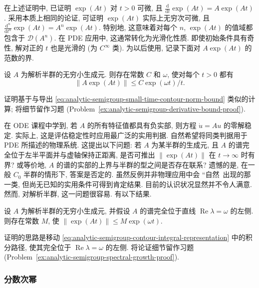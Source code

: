 在上述证明中, 已证明 $\exp(At)$ 对 $t>0$ 可微, 且 $\frac{\mathrm{d}}{\mathrm{d}t}\exp(At)=A\exp(At)$. 采用本质上相同的论证, 可证明 $\exp(At)$ 实际上无穷次可微, 且 $\frac{\mathrm{d}^n}{\mathrm{d}t^n}\exp(At)=A^n\exp(At)$. 特别地, 这意味着对每个 $n$, $\exp(At)$ 的值域都包含于 $\mathcal{D}(A^n)$. 在 PDE 应用中, 这通常转化为光滑化性质. 即使初始条件具有奇性, 解对正的 $t$ 也是光滑的 (为 $C^\infty$ 类). 为以后使用, 记录下面对 $A\exp(At)$ 的范数的界.

\begin{Lemma}
\label{lem:analytic-semigroup-time-derivative-bound}
设 $A$ 为解析半群的无穷小生成元. 则存在常数 $C$ 和 $\omega$, 使对每个 $t>0$ 都有
\begin{equation}\label{eq:analytic-semigroup-generator-time-derivative-bound}
\|A\exp(At)\|\leq C\exp(\omega t)/t.
\end{equation}

\end{Lemma}

证明基于与导出 \eqref{eq:analytic-semigroup-small-time-contour-norm-bound} 类似的计算; 将细节留作习题 (Problem~\ref{ex:analytic-semigroup-derivative-bound-proof}).

在 ODE 课程中学到, 若 $A$ 的所有特征值都具有负实部, 则方程 $\dot u=Au$ 的零解稳定. 实际上, 这是评估稳定性时应用最广泛的实用判据. 自然希望将同类判据用于 PDE 所描述的物理系统. 这提出以下问题: 若 $A$ 为某半群的生成元, 且 $A$ 的谱完全位于左半平面并与虚轴保持正距离, 是否可推出 $\|\exp(At)\|$ 在 $t\to\infty$ 时有界? 或等价地, $A$ 的谱的实部的上界与半群的型之间是否存在联系? 遗憾的是, 在一般 $C_0$ 半群的情形下, 答案是否定的. 虽然反例并非物理应用中会 ``自然\textquotesingle\textquotesingle\ 出现的那一类, 但尚无已知的实用条件可得到肯定结果. 目前的认识状况显然并不令人满意. 然而, 对解析半群, 这一问题很容易. 有以下结果.

\begin{Theorem}
\label{thm:analytic-semigroup-spectrum-controls-growth}
设 $A$ 为解析半群的无穷小生成元, 并假设 $A$ 的谱完全位于直线 $\operatorname{Re}\lambda=\omega$ 的左侧. 则存在常数 $M$, 使 $\|\exp(At)\|\leq M\exp(\omega t)$.
\end{Theorem}

证明的思路是移动 \eqref{eq:analytic-semigroup-contour-integral-representation} 中的积分路径, 使其完全位于 $\operatorname{Re}\lambda=\omega$ 的左侧. 将论证细节留作习题 (Problem~\ref{ex:analytic-semigroup-spectral-growth-proof}).

\subsubsection{分数次幂}\label{subsec:analytic-generator-fractional-powers}

